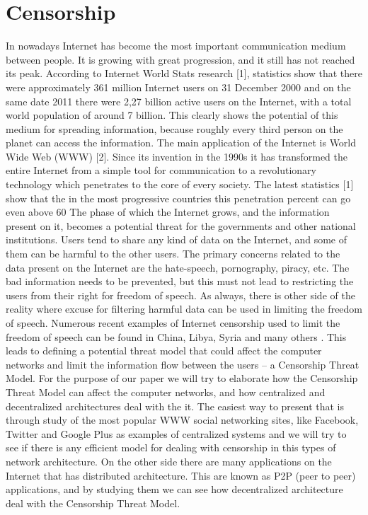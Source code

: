 \section{Censorship}
In nowadays Internet has become the most important communication medium between people. It is growing with great progression, and it still has not reached its peak. According to Internet World Stats research [1], statistics show that there were approximately 361 million Internet users on 31 December 2000 and on the same date 2011 there were 2,27 billion active users on the Internet, with a total world population of around 7 billion. This clearly shows the potential of this medium for spreading information, because roughly every third person on the planet can access the information. The main application of the Internet is World Wide Web (WWW) [2]. Since its invention in the 1990s it has transformed the entire Internet from a simple tool for communication to a revolutionary technology which penetrates to the core of every society. The latest statistics [1] show that the in the most progressive countries this penetration percent can go even above 60%
The phase of which the Internet grows, and the information present on it, becomes a potential threat for the governments and other national institutions. Users tend to share any kind of data on the Internet, and some of them can be harmful to the other users. The primary concerns related to the data present on the Internet are the hate-speech, pornography, piracy, etc. The bad information needs to be prevented, but this must not lead to restricting the users from their right for freedom of speech. As always, there is other side of the reality where excuse for filtering harmful data can be used in limiting the freedom of speech. Numerous recent examples of Internet censorship used to limit the freedom of speech can be found in China, Libya, Syria and many others \cite{dainotti2011}. 
This leads to defining a potential threat model that could affect the computer networks and limit the information flow between the users – a Censorship Threat Model.
For the purpose of our paper we will try to elaborate how the Censorship Threat Model can affect the computer networks, and how centralized and decentralized architectures deal with the it. The easiest way to present that is through study of the most popular WWW social networking sites, like Facebook, Twitter and Google Plus as examples of centralized systems and we will try to see if there is any efficient model for dealing with censorship in this types of network architecture. On the other side there are many applications on the Internet that has distributed architecture. This are known as P2P (peer to peer) applications, and by studying them we can see how decentralized architecture deal with the Censorship Threat Model.
